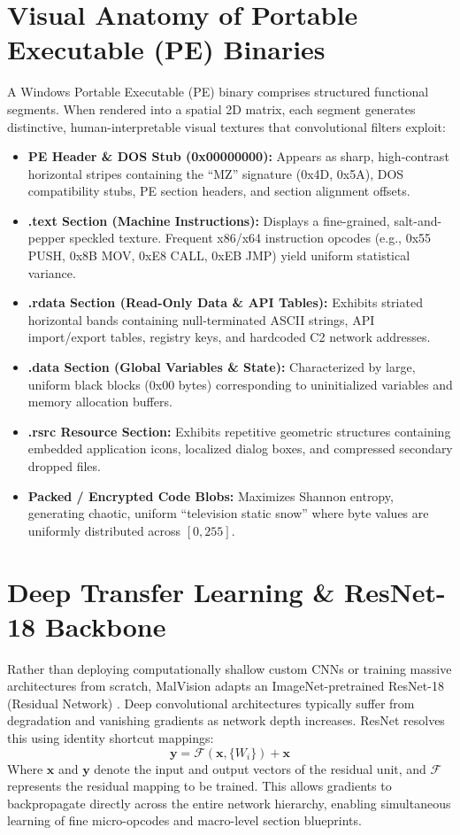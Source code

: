 \documentclass[journal,10pt,twocolumn]{IEEEtran}
\begin{document}
\section{Visual Anatomy of Portable Executable (PE) Binaries}
A Windows Portable Executable (PE) binary comprises structured functional segments. When rendered into a spatial 2D matrix, each segment generates distinctive, human-interpretable visual textures that convolutional filters exploit:
\begin{itemize}
    \item \textbf{PE Header \& DOS Stub (0x00000000):} Appears as sharp, high-contrast horizontal stripes containing the ``MZ'' signature (0x4D, 0x5A), DOS compatibility stubs, PE section headers, and section alignment offsets.
    \item \textbf{.text Section (Machine Instructions):} Displays a fine-grained, salt-and-pepper speckled texture. Frequent x86/x64 instruction opcodes (e.g., 0x55 PUSH, 0x8B MOV, 0xE8 CALL, 0xEB JMP) yield uniform statistical variance.
    \item \textbf{.rdata Section (Read-Only Data \& API Tables):} Exhibits striated horizontal bands containing null-terminated ASCII strings, API import/export tables, registry keys, and hardcoded C2 network addresses.
    \item \textbf{.data Section (Global Variables \& State):} Characterized by large, uniform black blocks (0x00 bytes) corresponding to uninitialized variables and memory allocation buffers.
    \item \textbf{.rsrc Resource Section:} Exhibits repetitive geometric structures containing embedded application icons, localized dialog boxes, and compressed secondary dropped files.
    \item \textbf{Packed / Encrypted Code Blobs:} Maximizes Shannon entropy, generating chaotic, uniform ``television static snow'' where byte values are uniformly distributed across $[0, 255]$.
\end{itemize}

\section{Deep Transfer Learning \& ResNet-18 Backbone}
Rather than deploying computationally shallow custom CNNs or training massive architectures from scratch, MalVision adapts an ImageNet-pretrained ResNet-18 (Residual Network) \cite{he2016resnet}. Deep convolutional architectures typically suffer from degradation and vanishing gradients as network depth increases. ResNet resolves this using identity shortcut mappings:
\begin{equation}
\mathbf{y} = \mathcal{F}(\mathbf{x}, \{W_i\}) + \mathbf{x}
\end{equation}
Where $\mathbf{x}$ and $\mathbf{y}$ denote the input and output vectors of the residual unit, and $\mathcal{F}$ represents the residual mapping to be trained. This allows gradients to backpropagate directly across the entire network hierarchy, enabling simultaneous learning of fine micro-opcodes and macro-level section blueprints.
\end{document}
